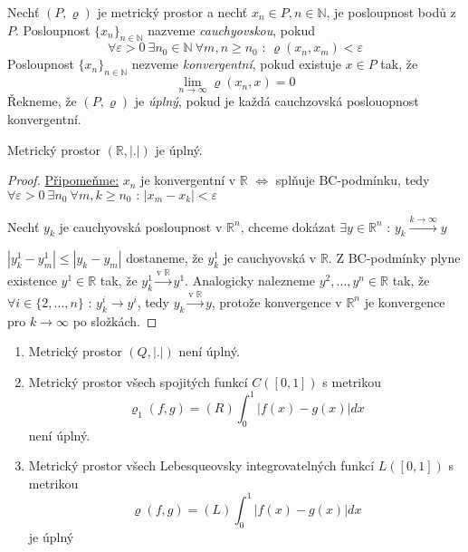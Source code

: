 \begin{definice}
Nechť $(P, \varrho)$ je metrický prostor a nechť $x_n \in P, n \in \mathbb{N}$, je posloupnost bodů z $P$. Posloupnost $\{ x_n \}_{n \in \mathbb{N}}$ nazveme \emph{cauchyovskou}, pokud
$$\forall \varepsilon > 0 \ \exists n_0 \in \mathbb{N} \ \forall m,n \geq n_0 \textrm{ : } \varrho(x_n, x_m) < \varepsilon$$
Posloupnost $\{ x_n \}_{n \in \mathbb{N}}$ nezveme \emph{konvergentní}, pokud existuje $x \in P$ tak, že
$$\lim_{n \rightarrow \infty} \varrho (x_n, x) = 0$$
Řekneme, že $(P, \varrho)$ je \emph{úplný}, pokud je každá cauchzovská poslouopnost konvergentní.
\end{definice}

\begin{vetal}
Metrický prostor $(\mathbb{R}, |.|)$ je úplný.
\end{vetal}

\begin{proof}
\underline{Připomeňme:} $x_n$ je konvergentní v $\mathbb{R}$ $\Leftrightarrow$ splňuje BC-podmínku, tedy $\forall \varepsilon > 0 \ \exists n_0 \ \forall m,k \geq n_0 \textrm{ : } |x_m - x_k| < \varepsilon$

Nechť $y_k$ je cauchyovská posloupnost v $\mathbb{R}^n$, chceme dokázat $\exists y \in \mathbb{R}^n \textrm{ : } y_k \overset{k \to \infty}{\to} y$ 

$|y_k^1 - y_m^1| \leq |y_k - y_m|$ dostaneme, že $y_k^1$ je cauchyovská v $\mathbb{R}$. Z BC-podmínky plyne existence $y^1 \in \mathbb{R}$ tak, že $y_k^1 \overset{\textrm{v }\mathbb{R}}{\to} y^1$. Analogicky nalezneme $y^2, \ldots, y^n \in \mathbb{R}$ tak, že $\forall i \in \{ 2, \ldots, n \} \textrm{ : } y_k^i \to y^i$, tedy $y_k \overset{\textrm{v } \mathbb{R}}{\to} y$, protože konvergence v $\mathbb{R}^n$ je konvergence pro $k \to \infty$ po složkách.
\end{proof}


\begin{priklad}
\begin{enumerate}
\item Metrický prostor $(Q, |.|)$ není úplný.
\item Metrický prostor všech spojitých funkcí $C([0, 1])$ s metrikou
$$\varrho_1(f,g) = (R) \int_0^1 |f(x) - g(x)| dx$$
není úplný.
\item Metrický prostor všech Lebesqueovsky integrovatelných funkcí $L([0,1])$ s metrikou
$$\varrho(f,g) = (L) \int_0^1 |f(x)-g(x)|dx$$
je úplný
\end{enumerate}
\end{priklad}

